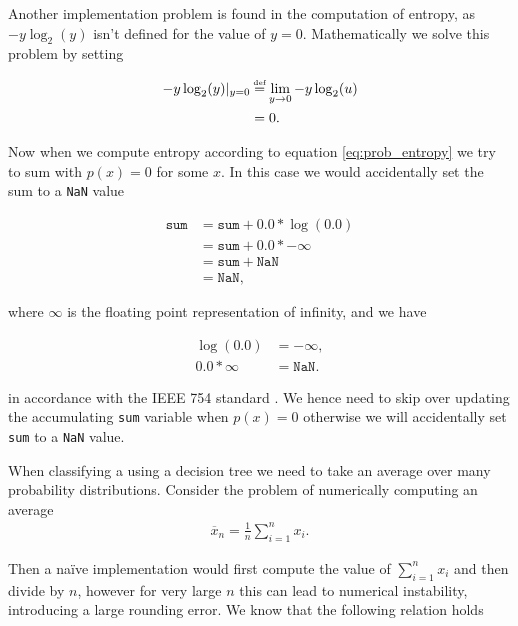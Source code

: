 \documentclass[12pt,twoside,notitlepage]{report}
\newcommand\defeq{\stackrel{\mathclap{\normalfont\tiny\mbox{def}}}{=}}
\begin{document}
                Another implementation problem is found in the computation of entropy, as $-y\log_2(y)$ isn't defined for 
                the value of $y=0$. Mathematically we solve this problem by setting

                \begin{align}
                    -y\log_2(y)|_{y=0} & \defeq \lim_{y\to 0} -y \log_2(u) \\
                        & = 0.
                \end{align}

                Now when we compute entropy according to equation \ref{eq:prob_entropy} we try to sum with $p(x)=0$ for 
                some $x$. In this case we would accidentally set the sum to a \texttt{NaN} value

                \begin{align}
                  \texttt{sum} &= \texttt{sum} + 0.0 * \log(0.0) \\
                    &= \texttt{sum} + 0.0 * -\infty \\
                    &= \texttt{sum} + \texttt{NaN}\\
                    &= \texttt{NaN},
                \end{align}

                where $\infty$ is the floating point representation of infinity, and we have 

                \begin{align}
                  \log(0.0) &= -\infty, \\
                  0.0 * \infty &= \texttt{NaN}.  
                \end{align}

                in accordance with the IEEE 754 standard \cite{1985--ieee754}. We hence need to skip over updating the 
                accumulating \texttt{sum} variable when $p(x) = 0$ otherwise we will accidentally set \texttt{sum} to a 
                \texttt{NaN} value.

                When classifying a using a decision tree we need to take an average over many probability distributions. 
                Consider the problem of numerically computing an average
                \begin{align}
                    \overline{x}_n = \frac{1}{n} \sum\limits_{i=1}^n x_i.
                    \label{eq:sum}
                \end{align}

                Then a na\"{i}ve implementation would first compute the value of $\sum\limits_{i=1}^n x_i$ and then 
                divide by $n$, however for very large $n$ this can lead to numerical instability, introducing a large 
                rounding error. We know that the following relation holds 
\end{document}
